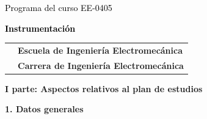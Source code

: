 \documentclass[letterpaper]{article}%
\begin{document}
%
\normalsize%
\thispagestyle{empty}%
%
\vspace*{100mm}%
\par\fontsize{14}{0}\selectfont \textcolor{black}{Programa del curso EE{-}0405}%
\par\fontsize{18}{25}\selectfont \textbf{\textcolor{black}{Instrumentación}}%
\vspace*{15mm}%
\newline%
\begin{tabularx}{\textwidth}{m{}m{}}%
&\hspace*{0mm}\fontsize{12}{0}\selectfont \textbf{\textcolor{gris}{Escuela de Ingeniería Electromecánica}}\\%
[-12pt]%
&\hspace*{0mm}\fontsize{12}{0}\selectfont \textbf{\textcolor{gris}{Carrera de Ingeniería Electromecánica}}\\%
\end{tabularx}%
\newpage%
\pagestyle{headfoot}%
\par\fontsize{14}{0}\selectfont \textbf{\textcolor{parte}{I parte: Aspectos relativos al plan de estudios}}%
\par\hspace*{2mm}\fontsize{12}{14}\selectfont \textbf{\textcolor{parte}{1. Datos generales}}%
\vspace*{3mm}%
\newline%
\fontsize{10}{12}\selectfont %
\end{document}
